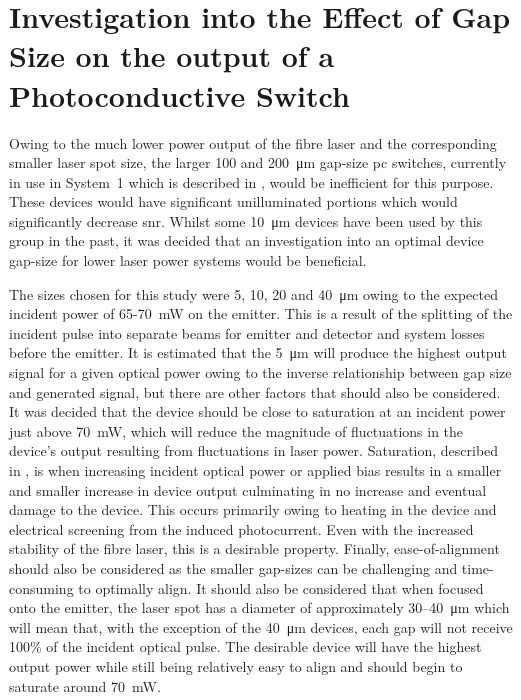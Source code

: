 \section{Investigation into the Effect of Gap Size on the output of a Photoconductive Switch}
Owing to the much lower power output of the fibre laser and the corresponding smaller laser spot size, the larger 100 and \SI{200}{\micro\metre} gap\nobreakdash-size \acrshort{pc} switches, currently in use in System~1 which is described in , would be inefficient for this purpose. These devices would have significant unilluminated portions which would significantly decrease \acrshort{snr}. Whilst some \SI{10}{\micro\metre} devices have been used by this group in the past, it was decided that an investigation into an optimal device gap\nobreakdash-size for lower laser power systems would be beneficial.

The sizes chosen for this study were 5, 10, 20 and \SI{40}{\micro\metre} owing to the expected incident power of 65\nobreakdash-\SI{70}{mW} on the emitter. This is a result of the splitting of the incident pulse into separate beams for emitter and detector and system losses before the emitter. It is estimated that the \SI{5}{\micro\metre} will produce the highest output signal for a given optical power owing to the inverse relationship between gap size and generated signal, but there are other factors that should also be considered. It was decided that the device should be close to saturation at an incident power just above \SI{70}{mW}, which will reduce the magnitude of fluctuations in the device's output resulting from fluctuations in laser power. Saturation, described in , is when increasing incident optical power or applied bias results in a smaller and smaller increase in device output culminating in no increase and eventual damage to the device. This occurs primarily owing to heating in the device and electrical screening from the induced photocurrent. Even with the increased stability of the fibre laser, this is a desirable property. Finally, ease\nobreakdash-of\nobreakdash-alignment should also be considered as the smaller gap\nobreakdash-sizes can be challenging and time\nobreakdash-consuming to optimally align. It should also be considered that when focused onto the emitter, the laser spot has a diameter of approximately 30\nobreakdash--\SI{40}{\micro\metre} which will mean that, with the exception of the \SI{40}{\micro\metre} devices, each gap will not receive 100\% of the incident optical pulse. The desirable device will have the highest output power while still being relatively easy to align and should begin to saturate around \SI{70}{mW}.

